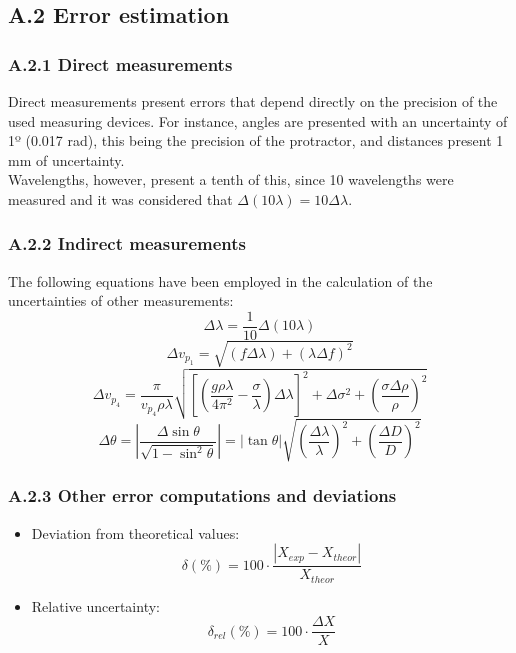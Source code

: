 \documentclass[a4paper, 12pt]{article}
\begin{document}
	\subsection{A.2 Error estimation}
	\subsubsection{A.2.1 Direct measurements}
	Direct measurements present errors that depend directly on the precision of the used measuring devices. For instance, angles are presented with an uncertainty of 1º (0.017 rad), this being the precision of the protractor, and distances present 1 mm of uncertainty. \\
	
	 Wavelengths, however, present a tenth of this, since 10 wavelengths were measured and it was considered that $\Delta (10\lambda) = 10 \Delta \lambda$.
	\subsubsection{A.2.2 Indirect measurements}
	The following equations have been employed in the calculation of the uncertainties of other measurements:
	\begin{equation}\label{deltalambda}
		\Delta \lambda = \frac{1}{10} \Delta (10\lambda)
	\end{equation}
	\begin{equation}\label{deltavp1}
		\Delta v_{p_1} = \sqrt{(f\Delta \lambda) + (\lambda \Delta f)^2}
	\end{equation}
	\begin{equation}\label{deltavp4}
		\Delta v_{p_4} = \frac{\pi}{v_{p_4}\rho\lambda}\sqrt{\left[\left(\frac{g\rho\lambda}{4\pi^2} - \frac{\sigma}{\lambda}\right)\Delta\lambda\right]^2 + \Delta \sigma^2 + \left(\frac{\sigma\Delta\rho}{\rho}\right)^2}
	\end{equation}
	\begin{equation}\label{deltatheta}
		\Delta \theta = \left|\frac{\Delta \sin \theta}{\sqrt{1-\sin^2\theta}}\right| = |\tan \theta|\sqrt{\left(\frac{\Delta \lambda}{\lambda}\right)^2 + \left(\frac{\Delta D}{D}\right)^2}
	\end{equation}
	\subsubsection{A.2.3 Other error computations and deviations}
	\begin{itemize}
		\item Deviation from theoretical values:
		\begin{equation}\label{dev}
			\delta (\%) = 100 \cdot \frac{|X_{exp} - X_{theor}|}{X_{theor}}
		\end{equation}
		\item Relative uncertainty:
		\begin{equation}\label{drel}
			\delta_{rel} (\%) = 100 \cdot \frac{\Delta X}{X}
		\end{equation}
		
	\end{itemize}
\end{document}
